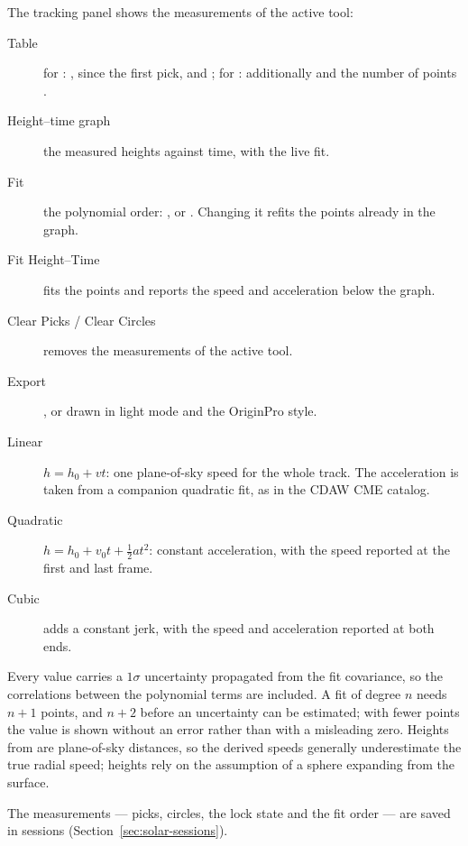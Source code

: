 The tracking panel shows the measurements of the active tool:
\begin{description}
  \item[Table] for : ,  since the first pick,
     and ; for : additionally 
    and the number of points .
  \item[Height--time graph] the measured heights against time, with the live fit.
  \item[Fit] the polynomial order: ,  or . Changing it
    refits the points already in the graph.
  \item[Fit Height–Time] fits the points and reports the speed and acceleration below the
    graph.
  \item[Clear Picks / Clear Circles] removes the measurements of the active tool.
  \item[Export] , or  drawn in
    light mode and the OriginPro style.
\end{description}

\begin{background}
  \begin{description}
    \item[Linear] \(h = h_0 + v t\): one plane-of-sky speed for the whole track. The
      acceleration is taken from a companion quadratic fit, as in the CDAW CME catalog.
    \item[Quadratic] \(h = h_0 + v_0 t + \tfrac12 a t^2\): constant acceleration, with the
      speed reported at the first and last frame.
    \item[Cubic] adds a constant jerk, with the speed and acceleration reported at both ends.
  \end{description}
  Every value carries a \(1\sigma\) uncertainty propagated from the fit covariance, so the
  correlations between the polynomial terms are included. A fit of degree \(n\) needs \(n+1\)
  points, and \(n+2\) before an uncertainty can be estimated; with fewer points the value is
  shown without an error rather than with a misleading zero. Heights from  are
  plane-of-sky distances, so the derived speeds generally underestimate the true radial
  speed;  heights rely on the assumption of a sphere expanding from the
  surface.
\end{background}

The measurements --- picks, circles, the lock state and the fit order --- are saved in
 sessions (Section~\ref{sec:solar-sessions}).
